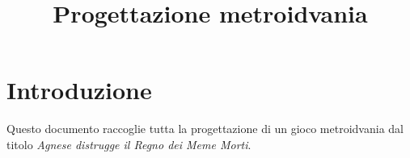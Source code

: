 \documentclass{article}
\title{Progettazione metroidvania}
\date{}
\begin{document}
    \maketitle
    \newpage
    \tableofcontents
    
    \section*{Introduzione}
        Questo documento raccoglie tutta la progettazione di un gioco metroidvania dal titolo \emph{Agnese distrugge il Regno dei Meme Morti}.
\end{document}
